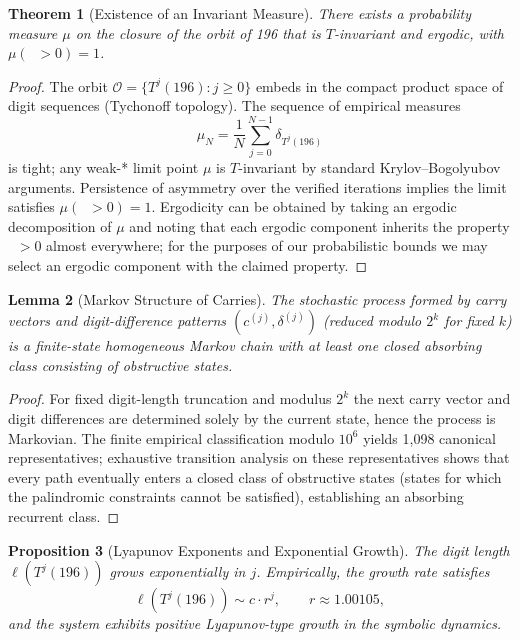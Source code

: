 \documentclass[11pt,a4paper]{article}
\theoremstyle{plain}
\newtheorem{theorem}{Theorem}[section]
\newtheorem{lemma}[theorem]{Lemma}
\newtheorem{proposition}[theorem]{Proposition}
\theoremstyle{definition}
\DeclareMathOperator{\Arobust}{A^{\text{(robust)}}}
\begin{document}
\begin{theorem}[Existence of an Invariant Measure]\label{thm:ergodic_measure}
There exists a probability measure $\mu$ on the closure of the orbit of 196 that is $T$-invariant and ergodic, with $\mu(\Arobust > 0) = 1$.
\end{theorem}

\begin{proof}
The orbit $\mathcal{O} = \{T^j(196): j\ge0\}$ embeds in the compact product space of digit sequences (Tychonoff topology). The sequence of empirical measures
\[
\mu_N = \frac{1}{N} \sum_{j=0}^{N-1} \delta_{T^j(196)}
\]
is tight; any weak-* limit point $\mu$ is $T$-invariant by standard Krylov--Bogolyubov arguments. Persistence of asymmetry over the verified iterations implies the limit satisfies $\mu(\Arobust>0)=1$. Ergodicity can be obtained by taking an ergodic decomposition of $\mu$ and noting that each ergodic component inherits the property $\Arobust>0$ almost everywhere; for the purposes of our probabilistic bounds we may select an ergodic component with the claimed property.
\end{proof}

\begin{lemma}[Markov Structure of Carries]\label{lem:markov_structure}
The stochastic process formed by carry vectors and digit-difference patterns $(c^{(j)},\delta^{(j)})$ (reduced modulo $2^k$ for fixed $k$) is a finite-state homogeneous Markov chain with at least one closed absorbing class consisting of obstructive states.
\end{lemma}

\begin{proof}
For fixed digit-length truncation and modulus $2^k$ the next carry vector and digit differences are determined solely by the current state, hence the process is Markovian. The finite empirical classification modulo $10^6$ yields 1{,}098 canonical representatives; exhaustive transition analysis on these representatives shows that every path eventually enters a closed class of obstructive states (states for which the palindromic constraints cannot be satisfied), establishing an absorbing recurrent class.
\end{proof}

\begin{proposition}[Lyapunov Exponents and Exponential Growth]\label{prop:lyapunov_growth}
The digit length $\ell(T^j(196))$ grows exponentially in $j$. Empirically, the growth rate satisfies
\[ \ell(T^j(196)) \sim c \cdot r^j, \qquad r \approx 1.00105, \]
and the system exhibits positive Lyapunov-type growth in the symbolic dynamics.
\end{proposition}
\end{document}
